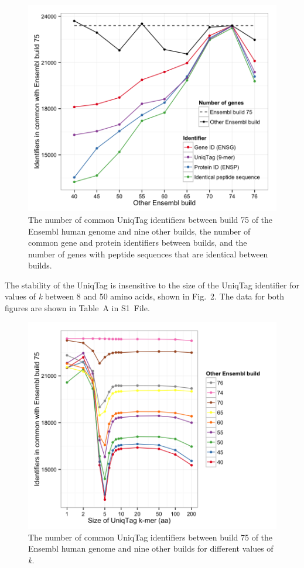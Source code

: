 \documentclass[10pt]{article}
\begin{document}
\begin{figure}[htbp]
\centering
\includegraphics{figure/ensembl.png}
\caption{The number of common UniqTag identifiers between build 75 of
the Ensembl human genome and nine other builds, the number of common
gene and protein identifiers between builds, and the number of genes
with peptide sequences that are identical between builds.}
\end{figure}

The stability of the UniqTag is insensitive to the size of the UniqTag
identifier for values of \emph{k} between 8 and 50 amino acids, shown in
Fig.~2. The data for both figures are shown in Table~A in S1~File.

\begin{figure}[htbp]
\centering
\includegraphics{figure/k.png}
\caption{The number of common UniqTag identifiers between build 75 of
the Ensembl human genome and nine other builds for different values of
\emph{k}.}
\end{figure}
\end{document}
